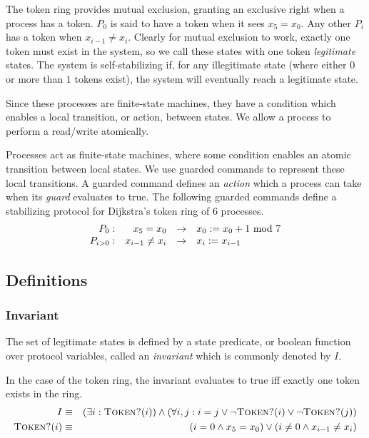 The token ring provides mutual exclusion, granting an exclusive right when a process has a token.
$P_0$ is said to have a token when it sees $x_5 = x_0$.
Any other $P_i$ has a token when $x_{i-1} \neq x_i$.
Clearly for mutual exclusion to work, exactly one token must exist in the system, so we call these states with one token {\em legitimate} states.
The system is self-stabilizing if, for any illegitimate state (where either $0$ or more than $1$ tokens exist), the system will eventually reach a legitimate state.

Since these processes are finite-state machines, they have a condition which enables a local transition, or action, between states.
We allow a process to perform a read/write atomically.

Processes act as finite-state machines, where some condition enables an atomic transition between local states.
We use guarded commands to represent these local transitions.
A guarded command defines an {\em action} which a process can take when its {\em guard} evaluates to true.
The following guarded commands define a stabilizing protocol for Dijkstra's token ring of $6$ processes.
\[
\begin{array}{rrcl}
 P_0: & x_{5} = x_0 & \to & x_0 := x_0 + 1 \mbox{ mod }7
\\ P_{i>0}: & x_{i-1} \neq x_i & \to & x_i := x_{i-1}
\end{array}
\]

\subsection{Definitions}

\subsubsection{Invariant}

The set of legitimate states is defined by a state predicate, or boolean function over protocol variables, called an {\em invariant} which is commonly denoted by $I$.

In the case of the token ring, the invariant evaluates to true iff exactly one token exists in the ring.
\begin{eqnarray*}
 I & \equiv & (\exists i: \text{\normalfont\scshape Token?}(i)) \wedge (\forall i, j: i = j \vee \neg \text{\normalfont\scshape Token?}(i) \vee \neg \text{\normalfont\scshape Token?}(j))
\\ \text{\normalfont\scshape Token?}(i) & \equiv & (i = 0 \wedge x_5 = x_0) \vee (i \neq 0 \wedge x_{i-1} \neq x_i)
\end{eqnarray*}

